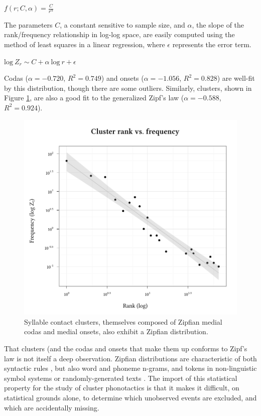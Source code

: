\ex $\displaystyle f(r; C, \alpha) = \frac{C}{r^\alpha}$ \xe

\noindent
The parameters $C$, a constant sensitive to sample size, and $\alpha$, the slope of the rank/frequency relationship in log-log space, are easily computed using the method of least squares in a linear regression, where $\epsilon$ represents the error term.

\ex $\displaystyle \textrm{log}~Z_r \sim C + \alpha~\textrm{log}~r + \epsilon$ \xe

\noindent
Codas ($\alpha = -0.720$, $R^2 = 0.749$) and onsets ($\alpha = -1.056$, $R^2 = 0.828$) are well-fit by this distribution, though there are some outliers. Similarly, clusters, shown in Figure \ref{clus}, are also a good fit to the generalized Zipf's law ($\alpha = -0.588$, $R^2 = 0.924$). 

\begin{figure}
\centering
\includegraphics{cluster.pdf}
\caption{Syllable contact clusters, themselves composed of Zipfian medial codas and medial onsets, also exhibit a Zipfian distribution.}
\label{clus}
\end{figure}

That clusters (and the codas and onsets that make them up conforms to Zipf's law is not itself a deep observation. Zipfian distributions are characteristic of both syntactic rules \citep{Yang2009}, but also word \citep{Baroni2009} and phoneme \citep{Daland2011a} n-grams, and tokens in non-linguistic symbol systems \citep{Chomsky1958,Sproat2010} or randomly-generated texts \citep{Miller1957,Li1992}. The import of this statistical property for the study of cluster phonotactics is that it makes it difficult, on statistical grounds alone, to determine which unobserved events are excluded, and which are accidentally missing. 

